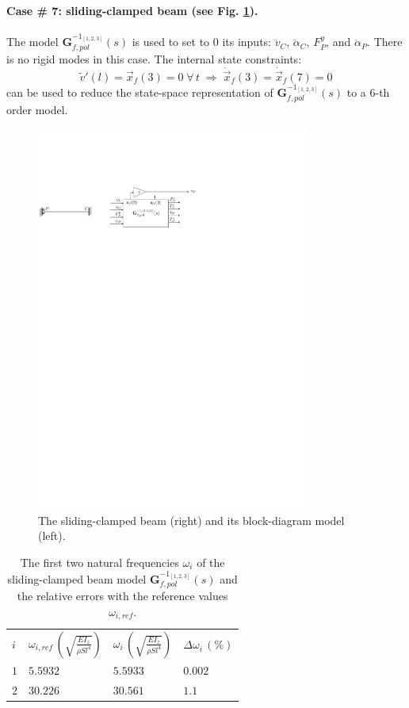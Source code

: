 \documentclass[smallcondensed]{svjour3}     %
\begin{document}
\FloatBarrier
\paragraph{Case \# 7: sliding-clamped beam (see Fig. \ref{fig:Tsc}).} The model $\mathbf{G}_{f,pol}^{-1_{[1,2,3]}}(s)$ is used to set to $0$ its inputs: $\ddot{v}_C$, $\ddot{\alpha}_C$, $F^y_P$, and $\ddot{\alpha}_P$. There is no rigid modes in this case. The internal state constraints:
\[
\widetilde{v}'(l)=\vec{x}_f(3)=0\;\forall\,t\;\Rightarrow\;\dot{\vec{x}}_f(3)=\dot{\vec{x}}_f(7)=0
\]
can be used to reduce the state-space representation of $\mathbf{G}_{f,pol}^{-1_{[1,2,3]}}(s)$ to a $6$-th order model.
\begin{figure}[htbp!]
  \includegraphics[width=0.8\textwidth]{Tscb}
\caption{The sliding-clamped beam (right) and its block-diagram model (left).}
\label{fig:Tsc} 
\end{figure}
\begin{table}[htbp!]
\caption{The first two natural frequencies $\omega_i$ of the sliding-clamped beam model $\mathbf{G}_{f,pol}^{-1_{[1,2,3]}}(s)$ and the relative errors with the reference values $\omega_{i,ref}$.}
\label{tab:Tsc}       %
\begin{tabular}{llll}
\hline\noalign{\smallskip}
  $i$ & $\omega_{i,ref}\,\left(\sqrt{\frac{EI_z}{\rho S l^4}}\right)$ &  $\omega_i\,\left(\sqrt{\frac{EI_z}{\rho S l^4}}\right)$ &  $\Delta \omega_i\,(\%)$ \\
\noalign{\smallskip}\hline\noalign{\smallskip}
$1$ & $5.5932$ & $5.5933$  & $0.002$ \\ 
$2$ & $30.226$ & $30.561$ & $1.1$ \\
\hline
\end{tabular}
\end{table}
\end{document}
